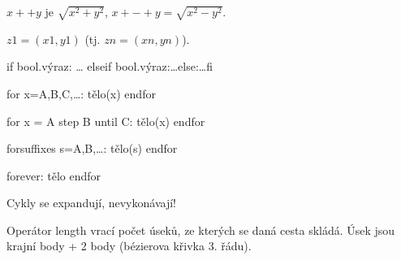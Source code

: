 \documentclass[12pt]{article}					%
\begin{document}
    \begin{definice}
        $x++y$ je $\sqrt{x^2 + y^2}$, $x+-+y = \sqrt{x^2 - y^2}$.

        $z1 = (x1, y1)$ (tj. $zn = (xn, yn)$).
    \end{definice}

    \begin{definice}
        if bool.výraz: … elseif bool.výraz:…else:…fi

        for x=A,B,C,…: tělo(x) endfor

        for x = A step B until C: tělo(x) endfor
        
        forsuffixes s=A,B,…: tělo(s) endfor

        forever: tělo endfor
    \end{definice}

    \begin{upozorneni}
        Cykly se expandují, nevykonávají!
    \end{upozorneni}

    \begin{definice}[Cesty]
        Operátor length vrací počet úseků, ze kterých se daná cesta skládá. Úsek jsou krajní body + 2 body (bézierova křivka 3. řádu).
    \end{definice}
\end{document}
